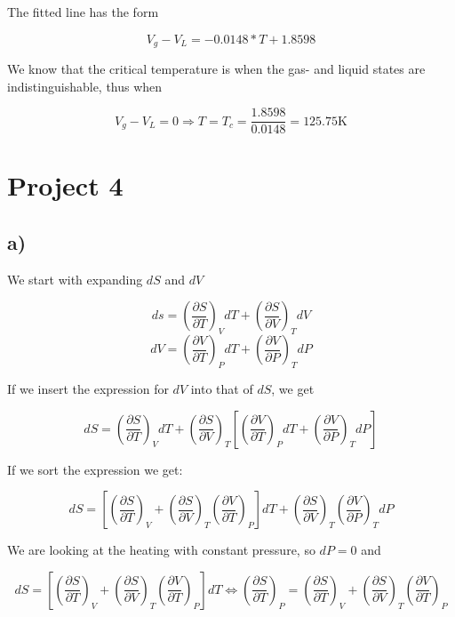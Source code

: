 \documentclass[a4paper,norsk, 10pt]{article}
\newcommand{\pd}[2]{\frac{\partial #1}{\partial #2}}
\begin{document}
The fitted line has the form

\begin{equation}
V_g - V_L = -0.0148*T + 1.8598
\end{equation}

We know that the critical temperature is when the gas- and liquid states are indistinguishable, thus when 

\begin{equation}
V_g - V_L = 0 \Rightarrow T = T_c = \frac{1.8598}{0.0148} = 125.75 \text{K}
\end{equation}


\section{Project 4}
\subsection{a)}
We start with expanding $dS$ and $dV$

\begin{equation}
ds = \left(\pd{S}{T}\right)_V dT + \left(\pd{S}{V}\right)_T dV
\label{eq:ds}
\end{equation}
\begin{equation}
dV = \left(\pd{V}{T}\right)_P dT + \left(\pd{V}{P}\right)_T dP
\label{eq:dV}
\end{equation}

If we insert the expression for $dV$ into that of $dS$, we get

\begin{equation}
dS = \left(\pd{S}{T}\right)_V dT + \left(\pd{S}{V}\right)_T\left[\left(\pd{V}{T}\right)_P dT + \left(\pd{V}{P}\right)_T dP\right]
\end{equation}

If we sort the expression we get:

\begin{equation}
dS = \left[\left(\pd{S}{T}\right)_V + \left(\pd{S}{V}\right)_T\left(\pd{V}{T}\right)_P\right]dT + \left(\pd{S}{V}\right)_T\left(\pd{V}{P}\right)_T dP
\end{equation}

We are looking at the heating with constant pressure, so $dP = 0$ and

\begin{equation}
dS = \left[\left(\pd{S}{T}\right)_V + \left(\pd{S}{V}\right)_T\left(\pd{V}{T}\right)_P\right]dT \Leftrightarrow \left(\pd{S}{T}\right)_P = \left(\pd{S}{T}\right)_V + \left(\pd{S}{V}\right)_T\left(\pd{V}{T}\right)_P
\end{equation}
\end{document}
